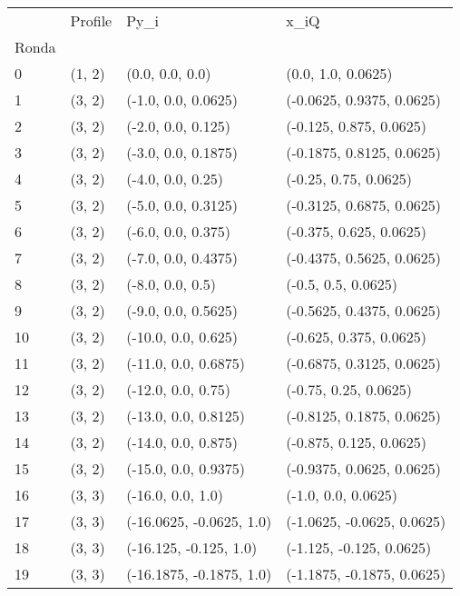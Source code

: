 \begin{tabular}{llll}
\toprule
{} & Profile &                      Py\_i &                        x\_iQ \\
Ronda &         &                           &                             \\
\midrule
0     &  (1, 2) &           (0.0, 0.0, 0.0) &          (0.0, 1.0, 0.0625) \\
1     &  (3, 2) &       (-1.0, 0.0, 0.0625) &   (-0.0625, 0.9375, 0.0625) \\
2     &  (3, 2) &        (-2.0, 0.0, 0.125) &     (-0.125, 0.875, 0.0625) \\
3     &  (3, 2) &       (-3.0, 0.0, 0.1875) &   (-0.1875, 0.8125, 0.0625) \\
4     &  (3, 2) &         (-4.0, 0.0, 0.25) &       (-0.25, 0.75, 0.0625) \\
5     &  (3, 2) &       (-5.0, 0.0, 0.3125) &   (-0.3125, 0.6875, 0.0625) \\
6     &  (3, 2) &        (-6.0, 0.0, 0.375) &     (-0.375, 0.625, 0.0625) \\
7     &  (3, 2) &       (-7.0, 0.0, 0.4375) &   (-0.4375, 0.5625, 0.0625) \\
8     &  (3, 2) &          (-8.0, 0.0, 0.5) &         (-0.5, 0.5, 0.0625) \\
9     &  (3, 2) &       (-9.0, 0.0, 0.5625) &   (-0.5625, 0.4375, 0.0625) \\
10    &  (3, 2) &       (-10.0, 0.0, 0.625) &     (-0.625, 0.375, 0.0625) \\
11    &  (3, 2) &      (-11.0, 0.0, 0.6875) &   (-0.6875, 0.3125, 0.0625) \\
12    &  (3, 2) &        (-12.0, 0.0, 0.75) &       (-0.75, 0.25, 0.0625) \\
13    &  (3, 2) &      (-13.0, 0.0, 0.8125) &   (-0.8125, 0.1875, 0.0625) \\
14    &  (3, 2) &       (-14.0, 0.0, 0.875) &     (-0.875, 0.125, 0.0625) \\
15    &  (3, 2) &      (-15.0, 0.0, 0.9375) &   (-0.9375, 0.0625, 0.0625) \\
16    &  (3, 3) &         (-16.0, 0.0, 1.0) &         (-1.0, 0.0, 0.0625) \\
17    &  (3, 3) &  (-16.0625, -0.0625, 1.0) &  (-1.0625, -0.0625, 0.0625) \\
18    &  (3, 3) &    (-16.125, -0.125, 1.0) &    (-1.125, -0.125, 0.0625) \\
19    &  (3, 3) &  (-16.1875, -0.1875, 1.0) &  (-1.1875, -0.1875, 0.0625) \\
\bottomrule
\end{tabular}
